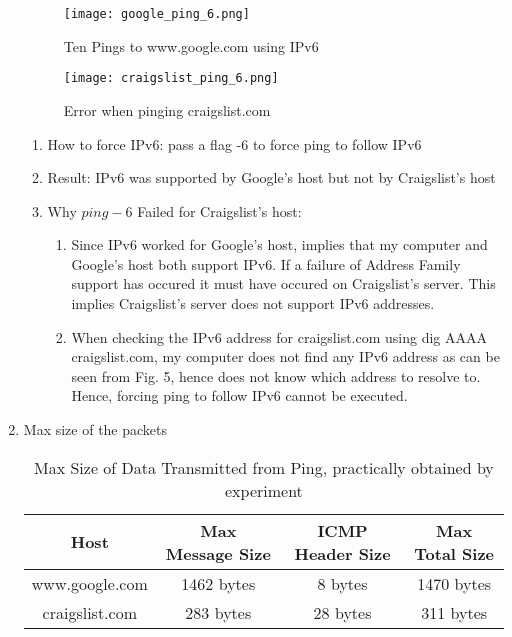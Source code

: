 \documentclass[12pt]{article}
\begin{document}
\begin{enumerate}
    \begin{figure}[h!]
        \centering
        \texttt{[image: google\_ping\_6.png]}
        \caption{Ten Pings to www.google.com using IPv6}
    \end{figure}
    \begin{figure}[h!]
        \centering
        \texttt{[image: craigslist\_ping\_6.png]}
        \caption{Error when pinging craigslist.com}
    \end{figure}
    \begin{enumerate}
        \item How to force IPv6: pass a flag -6 to force ping to follow IPv6
        \item Result: IPv6 was supported by Google's host but not by Craigslist's host
        \item Why $ping -6$ Failed for Craigslist's host: 
        \begin{enumerate}
            \item Since IPv6 worked for Google's host, implies that my computer and Google's host both support IPv6. If a failure of Address Family support has occured it must have occured on Craigslist's server. This implies Craigslist's server does not support IPv6 addresses.
            \item When checking the IPv6 address for craigslist.com using dig AAAA craigslist.com, my computer does not find any IPv6 address as can be seen from Fig. 5, hence does not know which address to resolve to. Hence, forcing ping to follow IPv6 cannot be executed.
        \end{enumerate}
    \end{enumerate}
    \item Max size of the packets
    \begin{table}[h!]
        \centering
        \caption{Max Size of Data Transmitted from Ping, practically obtained by experiment}
        \begin{tabular}{|c|c|c|c|}
            \hline
            Host & Max Message Size & ICMP Header Size & Max Total Size \\
            \hline
            www.google.com & 1462 bytes & 8 bytes & 1470 bytes \\
            craigslist.com & 283 bytes & 28 bytes & 311 bytes \\
            \hline
        \end{tabular}
    \end{table}
    \begin{enumerate}

\end{enumerate}
\end{enumerate}
\end{document}
